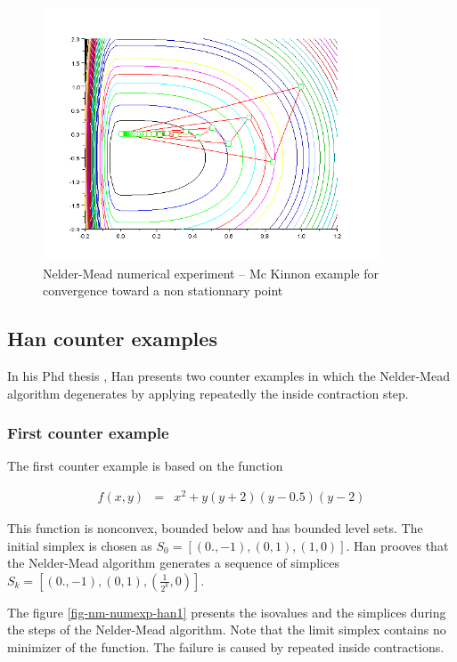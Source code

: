 \begin{figure}
\begin{center}
\includegraphics[width=10cm]{mckinnon-history-simplex.png}
\end{center}
\caption{Nelder-Mead numerical experiment -- Mc Kinnon example for convergence toward
a non stationnary point}
\label{fig-nm-numexp-mckinnon}
\end{figure}

\subsection{Han counter examples}

In his Phd thesis \cite{Han2000}, Han presents two counter examples
in which the Nelder-Mead algorithm degenerates by applying repeatedly
the inside contraction step.

\subsubsection{First counter example}

The first counter example is based on the function 

\begin{eqnarray}
\label{han-function1}
f(x,y) &=& x^2 + y ( y + 2 ) ( y - 0.5 ) ( y - 2 )
\end{eqnarray}

This function is nonconvex, bounded below and has bounded level 
sets. The initial simplex is chosen as $S_0 = [(0.,-1),(0,1),(1,0)]$.
Han prooves that the Nelder-Mead algorithm generates a sequence of simplices
$S_k = [(0.,-1),(0,1),(\frac{1}{2^k},0)]$.

The figure \ref{fig-nm-numexp-han1} presents the isovalues and the 
simplices during the steps of the Nelder-Mead algorithm.
Note that the limit simplex contains no minimizer of the function.
The failure is caused by repeated inside contractions.

